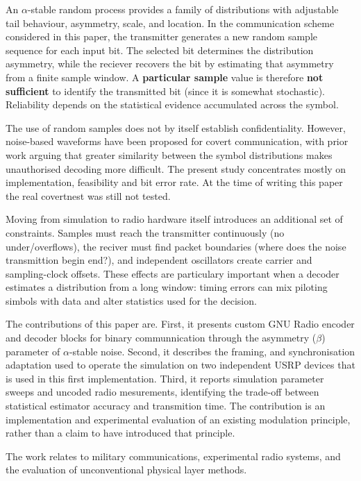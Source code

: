 \documentclass[conference]{IEEEtran}
\begin{document}
An $\alpha$-stable random process provides a family of distributions with adjustable tail behaviour, asymmetry, scale, and location. In the communication scheme considered in this paper, the transmitter generates a new random sample sequence for each input bit.
The selected bit determines the distribution asymmetry, while the reciever recovers the bit by estimating that asymmetry from a finite sample window.
A \textbf{particular sample} value is therefore \textbf{not sufficient} to identify the transmitted bit (since it is somewhat stochastic). 
Reliability depends on the statistical evidence accumulated across the symbol. 

The use of random samples does not by itself establish confidentiality. However, noise-based waveforms have been proposed for covert communication, with prior work arguing that greater similarity between the symbol distributions makes unauthorised decoding more difficult\cite{b3}. The present study concentrates mostly on implementation, feasibility and bit error rate. At the time of writing this paper the real covertnest was still not tested. 

Moving from simulation to radio hardware itself introduces an additional set of constraints. Samples must reach the transmitter continuously (no under/overflows), the reciver must find packet boundaries (where does the noise transmittion begin end?), and independent oscillators create carrier and sampling-clock offsets. These effects are particulary important when a decoder estimates a distribution from a long window: timing errors can mix piloting simbols with data and alter statistics used for the decision.

The contributions of this paper are. First, it presents custom GNU Radio encoder and decoder blocks for binary communnication through the asymmetry ($\beta$) parameter of $\alpha$-stable noise. Second, it describes the framing, and synchronisation adaptation used to operate the simulation on two independent USRP devices that is used in this first implementation. Third, it reports simulation parameter sweeps and uncoded radio mesurements, identifying the trade-off between statistical estimator accuracy and transmition time. The contribution is an implementation and experimental evaluation of an existing modulation principle, rather than a claim to have introduced that principle.

The work relates to military communications, experimental radio systems, and the evaluation of unconventional physical layer methods. 
\end{document}
